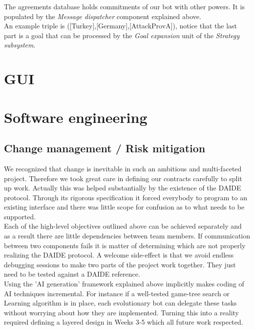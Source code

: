 \documentclass[pdftex,12pt,a4paper]{report}
\begin{document}
The agreements database holds commitments of our bot with 
other powers. It is populated by the \textit{Message dispatcher}
component explained above. \\

An example triple is ([Turkey],[Germany],[AttackProvA]),
notice that the last part is a goal that can be processed by the
\textit{Goal expansion} unit of the \textit{Strategy subsystem}.



\chapter{GUI}



\pagebreak

\chapter{Software engineering}

\section{Change management / Risk mitigation}
We recognized that change is inevitable in such an ambitious and
multi-faceted project. Therefore we took great care in defining our
contracts carefully to split up work. Actually this was helped
substantially by the existence of the DAIDE protocol. Through its
rigorous specification it forced everybody to program to an existing
interface and there was little scope for confusion as to what needs to
be supported.  \\ Each of the high-level objectives outlined above can
be achieved separately and as a result there are little dependencies
between team members.  If communication between two components fails
it is matter of determining which are not properly realizing the DAIDE
protocol. A welcome side-effect is that we avoid endless debugging
sessions to make two parts of the project work together. They just
need to be tested against a DAIDE reference.  \\ Using the 'AI
generation' framework explained above implicitly makes coding of AI
techniques incremental. For instance if a well-tested game-tree search
or Learning algorithm is in place, each evolutionary bot can delegate
these tasks without worrying about how they are implemented. Turning
this into a reality required defining a layered design in Weeks 3-5
which all future work respected.  \\
\end{document}
